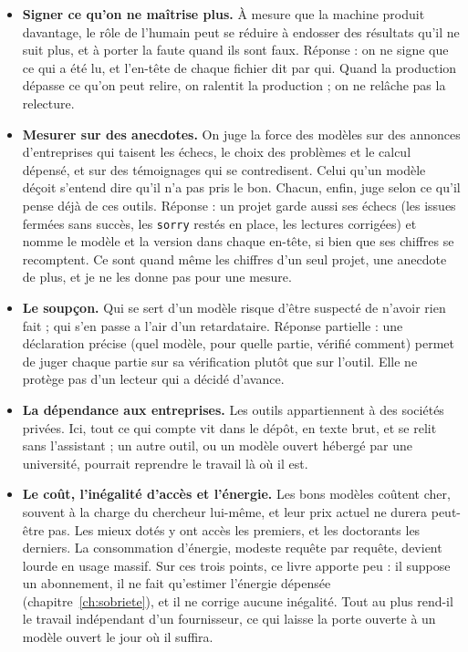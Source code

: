 \begin{itemize}
        modèle peut en produire une partie. Réponse partielle seulement : ce livre
        s'adresse à qui a déjà cette formation, et la boucle de relecture oblige à
        comprendre chaque énoncé qu'on signe. Pour les étudiants et pour l'évaluation des
        thèses, la question reste ouverte, et je n'ai pas de réponse.
  \item \textbf{Signer ce qu'on ne maîtrise plus.} À mesure que la machine produit davantage,
        le rôle de l'humain peut se réduire à endosser des résultats qu'il ne suit plus, et
        à porter la faute quand ils sont faux. Réponse : on ne signe que ce qui a été lu, et
        l'en-tête de chaque fichier dit par qui. Quand la production dépasse ce qu'on peut
        relire, on ralentit la production ; on ne relâche pas la relecture.
  \item \textbf{Mesurer sur des anecdotes.} On juge la force des modèles sur des annonces
        d'entreprises qui taisent les échecs, le choix des problèmes et le calcul dépensé,
        et sur des témoignages qui se contredisent. Celui qu'un modèle déçoit s'entend dire
        qu'il n'a pas pris le bon. Chacun, enfin, juge selon ce qu'il pense déjà de ces
        outils. Réponse : un projet garde aussi ses échecs (les issues fermées sans
        succès, les \texttt{sorry} restés en place, les lectures corrigées) et nomme le
        modèle et la version dans chaque en-tête, si bien que ses chiffres se recomptent.
        Ce sont quand même les chiffres d'un seul projet, une anecdote de plus, et je ne
        les donne pas pour une mesure.
  \item \textbf{Le soupçon.} Qui se sert d'un modèle risque d'être suspecté de n'avoir rien
        fait ; qui s'en passe a l'air d'un retardataire. Réponse partielle : une déclaration
        précise (quel modèle, pour quelle partie, vérifié comment) permet de juger chaque
        partie sur sa vérification plutôt que sur l'outil. Elle ne protège pas d'un
        lecteur qui a décidé d'avance.
  \item \textbf{La dépendance aux entreprises.} Les outils appartiennent à des sociétés privées.
        Ici, tout ce qui compte vit dans le dépôt, en texte brut, et se relit sans
        l'assistant ; un autre outil, ou un modèle ouvert hébergé par une université,
        pourrait reprendre le travail là où il est.
  \item \textbf{Le coût, l'inégalité d'accès et l'énergie.} Les bons modèles coûtent cher, souvent
        à la charge du chercheur lui-même, et leur prix actuel ne durera peut-être pas. Les
        mieux dotés y ont accès les premiers, et les doctorants les derniers. La
        consommation d'énergie, modeste requête par requête, devient lourde en usage
        massif. Sur ces trois points, ce livre apporte peu : il suppose un abonnement,
        il ne fait qu'estimer l'énergie dépensée (chapitre~\ref{ch:sobriete}), et il ne
        corrige aucune inégalité. Tout au
        plus rend-il le travail indépendant d'un fournisseur, ce qui laisse la porte
        ouverte à un modèle ouvert le jour où il suffira.
\end{itemize}

